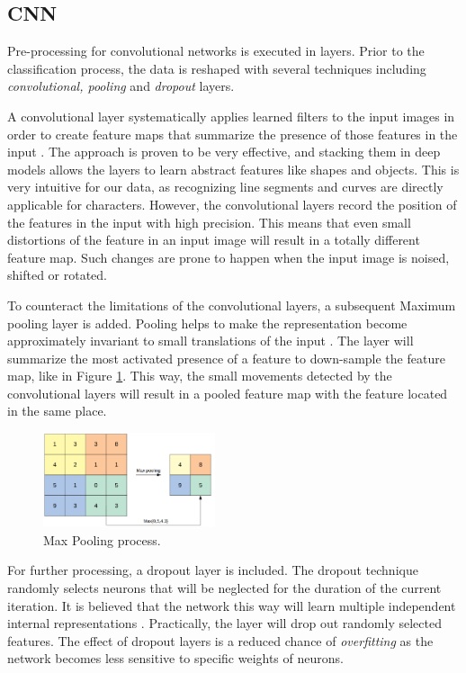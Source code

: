 \subsection{CNN}

Pre-processing for convolutional networks is executed in layers. Prior to the classification process, the data is reshaped with several techniques including \textit{convolutional, pooling} and \textit{dropout} layers.

A convolutional layer systematically applies learned filters to the input images in order to create feature maps that summarize the presence of those features in the input \cite{Brownlee2019}. The approach is proven to be very effective, and stacking them in deep models allows the layers to learn abstract features like shapes and objects. This is very intuitive for our data, as recognizing line segments and curves are directly applicable for characters. However, the convolutional layers record the position of the features in the input with high precision. This means that even small distortions of the feature in an input image will result in a totally different feature map. Such changes are prone to happen when the input image is noised, shifted or rotated.

To counteract the limitations of the convolutional layers, a subsequent Maximum pooling layer is added. Pooling helps to make the representation become approximately invariant to small translations of the input  \cite{Brownlee2019}. The layer will summarize the most activated presence of a feature to down-sample the feature map, like in Figure \ref{fig:maxP}. This way, the small movements detected by the convolutional layers will result in a pooled feature map with the feature located in the same place.

\begin{figure}[H]
    \centering
    \includegraphics[width=0.45\textwidth]{pictures/maxPooling.png}
    \caption{Max Pooling process.}
    \label{fig:maxP}
\end{figure}

For further processing, a dropout layer is included. The dropout technique randomly selects neurons that will be neglected for the duration of the current iteration. It is believed that the network this way will learn multiple independent internal representations \cite{Brownlee2016}. Practically, the layer will drop out randomly selected features. The effect of dropout layers is a reduced chance of \textit{overfitting} as the network becomes less sensitive to specific weights of neurons.




